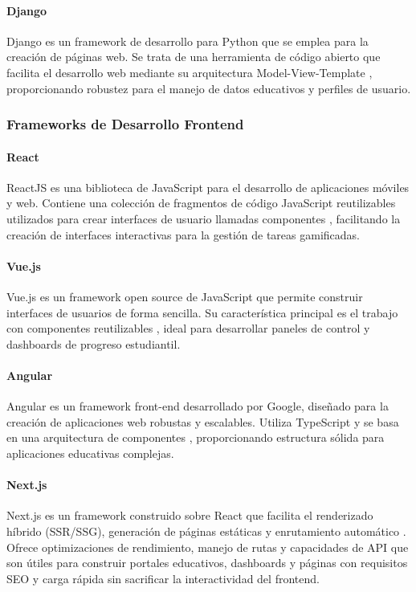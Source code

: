 \paragraph{Django}
Django es un framework de desarrollo para Python que se emplea para la creación de páginas web. Se trata de una herramienta de código abierto que facilita el desarrollo web mediante su arquitectura Model-View-Template \cite{fernandez2022}, proporcionando robustez para el manejo de datos educativos y perfiles de usuario.

\subsubsection{Frameworks de Desarrollo Frontend}

\paragraph{React}
ReactJS es una biblioteca de JavaScript para el desarrollo de aplicaciones móviles y web. Contiene una colección de fragmentos de código JavaScript reutilizables utilizados para crear interfaces de usuario llamadas componentes \cite{deyimar2023}, facilitando la creación de interfaces interactivas para la gestión de tareas gamificadas.

\paragraph{Vue.js}
Vue.js es un framework open source de JavaScript que permite construir interfaces de usuarios de forma sencilla. Su característica principal es el trabajo con componentes reutilizables \cite{garcia2019}, ideal para desarrollar paneles de control y dashboards de progreso estudiantil.

\paragraph{Angular}
Angular es un framework front-end desarrollado por Google, diseñado para la creación de aplicaciones web robustas y escalables. Utiliza TypeScript y se basa en una arquitectura de componentes \cite{roldan2020}, proporcionando estructura sólida para aplicaciones educativas complejas.

\paragraph{Next.js}
Next.js es un framework construido sobre React que facilita el renderizado híbrido (SSR/SSG), generación de páginas estáticas y enrutamiento automático \cite{nextjs_docs2024}. Ofrece optimizaciones de rendimiento, manejo de rutas y capacidades de API que son útiles para construir portales educativos, dashboards y páginas con requisitos SEO y carga rápida sin sacrificar la interactividad del frontend.

